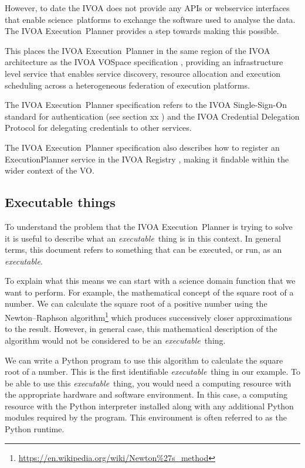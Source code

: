 \documentclass[11pt,a4paper]{ivoa}
\newcommand{\webservice} {webservice}
\newcommand{\ivoa} {IVOA}
\newcommand{\vospace} {VOSpace}
\newcommand{\execplanner} {ExecutionPlanner}
\newcommand{\executionplanner} {Execution~Planner}
\newcommand{\python} {Python}
\newcommand{\pythonprogram} {Python program}
\newcommand{\footurl}[1] {\footnote{\url{#1}}}
\newcommand{\scienceplatform} {science~platform}
\newcommand{\executable} {\textit{executable}}
\newcommand{\executablething} {\textit{executable}~thing}
\begin{document}
However, to date the \ivoa{} does not provide any APIs or \webservice{} interfaces that
enable \scienceplatform{}s to exchange the software used to analyse the data.
The \ivoa{} \executionplanner{} provides a step towards making this possible.

This places the \ivoa{} \executionplanner{} in the same region of the \ivoa{} architecture
as the \ivoa{} \vospace{} specification \citep{2009ivoa.specQ1007G},
providing an infrastructure level service that enables service discovery,
resource allocation and execution scheduling across a heterogeneous federation
of execution platforms.

The \ivoa{} \executionplanner{} specification refers to the
\ivoa{} Single-Sign-On standard \citep{2017ivoa.spec.0524T}
for authentication (see section xx )%
and the
\ivoa{} Credential Delegation Protocol \citep{2010ivoa.spec.0218P}
for delegating credentials to other services.

The \ivoa{} \executionplanner{} specification also describes how to register
an \execplanner{} service in the
\ivoa{} Registry \citep{2009ivoa.spec.1104B},
making it findable within the wider context of the VO.

\subsection{Executable things}
\label{executablething}

To understand the problem that the \ivoa{} \executionplanner{} is trying to solve
it is useful to describe what an \executablething{} is in this context.
In general terms, this document refers to something that can be executed, or run,
as an \executable{}.

To explain what this means we can start with a science domain function that we want to perform.
For example, the mathematical concept of the square root of a number.
We can calculate the square root of a positive number using the Newton–Raphson
algorithm\footurl{https://en.wikipedia.org/wiki/Newton\%27s_method}
which produces successively closer approximations to the result.
However, in general case, this mathematical description of the algorithm would not be
considered to be an \executablething{}.

We can write a \pythonprogram{} to use this algorithm to calculate the square root of a number.
This is the first identifiable \executablething{} in our example.
To be able to use this \executablething{}, you would need a computing resource with the appropriate
hardware and software environment. In this case, a computing resource with the \python{} interpreter
installed along with any additional \python{} modules required by the program.
This environment is often referred to as the \python{} runtime.
\end{document}
